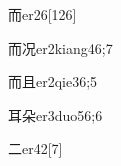 \begin{verbete}{而}{er2}{6}[126]
\end{verbete}

\begin{verbete}{而况}{er2kiang4}{6;7}
\end{verbete}

\begin{verbete}{而且}{er2qie3}{6;5}
\end{verbete}

\begin{verbete}{耳朵}{er3duo5}{6;6}
\end{verbete}

\begin{verbete}{二}{er4}{2}[7]
\end{verbete}

